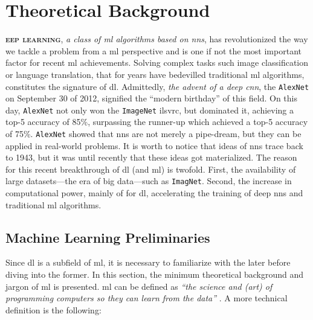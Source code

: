 \chapter{Theoretical Background}

\lettrine[
	nindent=0em, findent=0.5em, loversize=-0.12, lines=5
]{}{\bfseries\color{Blue}eep learning}, \emph{a class of \gls{ml} algorithms based on
\glspl{nn}}, has revolutionized the way we tackle a problem from a \gls{ml}
perspective and is one if not the most important factor for recent \gls{ml}
achievements. Solving complex tasks such image classification or language translation, that for
years have bedevilled traditional \gls{ml} algorithms, constitutes the signature
of \gls{dl}. Admittedly, \emph{the advent of a deep
\gls{cnn}}, the \texttt{AlexNet}
\parencite{alexnet} on September 30 of 2012, signified the ``modern birthday''
of this field. On this day, \texttt{AlexNet} not only won the
\texttt{ImageNet} \parencite{Deng_2009} \gls{ilsvrc}, but dominated it,
achieving a top-5 accuracy of 85\%, surpassing the
runner-up which achieved a top-5 accuracy of 75\%. \texttt{AlexNet} showed that
\glspl{nn} are not merely a pipe-dream, but they can be applied in real-world
problems. It is worth to notice that ideas of \glspl{nn} trace back to 1943, but
it was until recently that these ideas got materialized. The reason for this
recent breakthrough of \gls{dl} (and \gls{ml}) is twofold. First, the
availability of large datasets---the era of big data---such as
\texttt{ImagNet}. Second, the increase in computational power,
mainly of  for \gls{dl}, accelerating the training of deep
\glspl{nn} and traditional \gls{ml} algorithms.

\section{Machine Learning Preliminaries}

Since \gls{dl} is a subfield of \gls{ml}, it is necessary to familiarize with
the later before diving into the former. In this section, the minimum
theoretical background and jargon of \gls{ml} is presented. \acrlong{ml} can be
defined as \emph{``the science and (art) of programming computers so they can
learn from the data''} \parencite{ml}. A more technical definition is the following:


